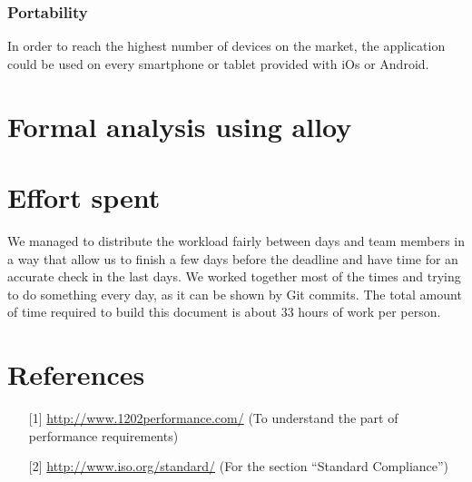 \documentclass[12pt,titlepage]{article}
\begin{document}
\subsubsection{Portability}\label{sec:mod1}
In order to reach the highest number of devices on the market, the application could be used on every smartphone or tablet provided with iOs or Android. 
\pagebreak
\section{Formal analysis using alloy}\label{sec:crit}
\pagebreak
\section{Effort spent}\label{sec:crit}
We managed to distribute the workload fairly between days and team members in a way that allow us to finish a few days before the deadline and have time for an accurate check in the last days.
We worked together most of the times and trying to do something every day, as it can be shown by Git commits.
The total amount of time required to build this document is about 33 hours of work per person.
\pagebreak

\section{References}\label{sec:crit}
\begin{itemize}
\item [{[1]}] \url{http://www.1202performance.com/} (To understand the part of performance requirements)
\item [{[2]}] \url{http://www.iso.org/standard/} (For the section ``Standard Compliance'')
\end{itemize}
\end{document}
